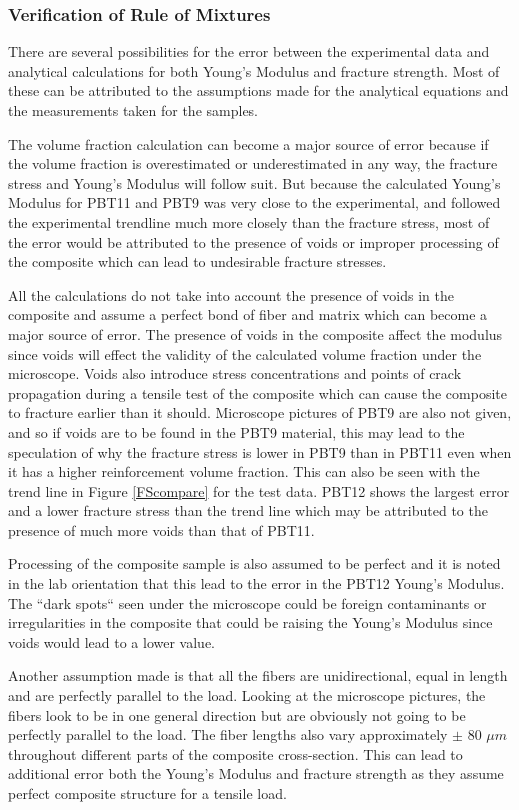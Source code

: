 \documentclass[11pt]{article}
\begin{document}
\subsubsection{Verification of Rule of Mixtures}

There are several possibilities for the error between the experimental data and analytical calculations for both Young's Modulus and fracture strength. Most of these can be attributed to the assumptions made for the analytical equations and the measurements taken for the samples.

The volume fraction calculation can become a major source of error because if the volume fraction is overestimated or underestimated in any way, the fracture stress and Young's Modulus will follow suit. But because the calculated Young's Modulus for PBT11 and PBT9 was very close to the experimental, and followed the experimental trendline much more closely than the fracture stress, most of the error would be attributed to the presence of voids or improper processing of the composite which can lead to undesirable fracture stresses.

All the calculations do not take into account the presence of voids in the composite and assume a perfect bond of fiber and matrix which can become a major source of error. The presence of voids in the composite affect the modulus since voids will effect the validity of the calculated volume fraction under the microscope. Voids also introduce stress concentrations and points of crack propagation during a tensile test of the composite which can cause the composite to fracture earlier than it should. Microscope pictures of PBT9 are also not given, and so if voids are to be found in the PBT9 material, this may lead to the speculation of why the fracture stress is lower in PBT9 than in PBT11 even when it has a higher reinforcement volume fraction. This can also be seen with the trend line in Figure \ref{FScompare} for the test data. PBT12 shows the largest error and a lower fracture stress than the trend line which may be attributed to the presence of much more voids than that of PBT11. 

Processing of the composite sample is also assumed to be perfect and it is noted in the lab orientation that this lead to the error in the PBT12 Young's Modulus. The ``dark spots`` seen under the microscope could be foreign contaminants or irregularities in the composite that could be raising the Young's Modulus since voids would lead to a lower value.

Another assumption made is that all the fibers are unidirectional, equal in length and are perfectly parallel to the load. Looking at the microscope pictures, the fibers look to be in one general direction but are obviously not going to be perfectly parallel to the load. The fiber lengths also vary approximately $\pm$ 80 $\mu m$ throughout different parts of the composite cross-section. This can lead to additional error both the Young's Modulus and fracture strength as they assume perfect composite structure for a tensile load.
\singlespacing
\end{document}
